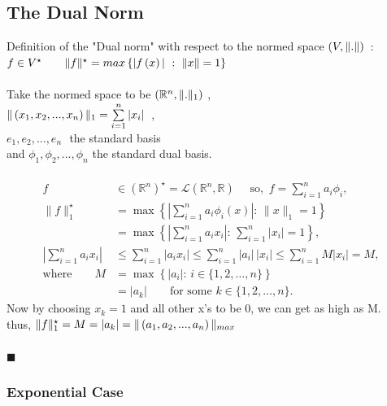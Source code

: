 \documentclass[12pt]{article}
\newcommand{\R}{\mathbb{R}}
\begin{document}
	\newpage
	
	\subsection{The Dual Norm}
	Definition of the "Dual norm"\cite{apostol} with respect to the normed space
	$\left(V,\Arrowvert.\Arrowvert\right)$ \,:  \\
	$f\in V^\star \quad\quad \Arrowvert f \Arrowvert^\star =max\left\{|f\left(x\right)| \,\, : \,\, \Arrowvert x \Arrowvert = 1 \right\}$ \\
	\\ 
	Take the normed space to be $\left(\R ^n , \Arrowvert.\Arrowvert _1\right)$ , \\
	$ \Arrowvert \left(x_1,x_2,...,x_n\right) \Arrowvert_1 =  \sum\limits_{i=1}^{n}|x_i|$ \,,
	\\
	$e_1, e_2, ..., e_n \,\,$ the standard basis\\
	and $\phi_1 , \phi_2 , ... , \phi_n$ the standard dual basis.
	\\
	\\
	\begin{align*}
		f &\in (\mathbb{R}^n)^\star = \mathcal{L}(\mathbb{R}^n,\mathbb{R})
		\quad \text{        so,} \,\,\,
		f = \sum_{i=1}^{n} a_i \phi_i,
		\\[6pt]
		\|f\|_1^\star
		&=
		\max\left\{
		\left|
		\sum_{i=1}^{n} a_i \phi_i(x)
		\right|
		:\,
		\|x\|_1=1
		\right\}
		\\
		&=
		\max\left\{
		\left|
		\sum_{i=1}^{n} a_i x_i
		\right|
		:\,
		\sum_{i=1}^{n}|x_i|=1
		\right\},
		\\[6pt]
		\left|
		\sum_{i=1}^{n} a_i x_i
		\right|
		&\le
		\sum_{i=1}^{n}|a_i x_i|
		\le
		\sum_{i=1}^{n}|a_i|\,|x_i|
		\le
		\sum_{i=1}^{n} M|x_i|
		= M,
		\\[6pt]
		\text{where}\qquad
		M
		&=
		\max\left\{
		|a_i|
		:\,
		i\in\{1,2,\ldots,n\}
		\right\}
		\\
		&=
		|a_k|
		\qquad
		\text{for some }
		k\in\{1,2,\ldots,n\}.
	\end{align*}
	Now by choosing $x_k=1$ and all other x's to be 0, we can get as high as M. \vspace{5pt} \\
	thus, $\Arrowvert f \Arrowvert^\star_1 =M= |a_k|= \Arrowvert \left(a_1,a_2,...,a_n\right) \Arrowvert_{max} $ \\
		\\
	\phantom{a}\hfill$\blacksquare$
	
	\subsubsection{Exponential Case}
\end{document}
